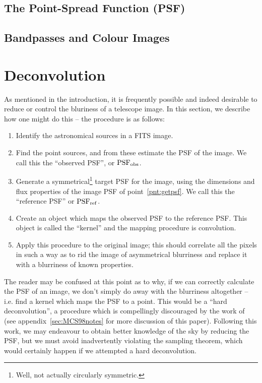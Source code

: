 \documentclass[letterpaper, 11pt]{article}
\def\psfobs{\ensuremath{\rm PSF_{obs}}\xspace}
\def\psfref{\ensuremath{\rm PSF_{ref}}\xspace}
\begin{document}
\subsection{The Point-Spread Function (PSF)}

\subsection{Bandpasses and Colour Images}

\newpage
\section{Deconvolution}
\label{sec:deconvolution}

As mentioned in the introduction, it is frequently possible and indeed desirable to reduce or control the bluriness of a telescope image. In this section, we describe how one might do this -- the procedure is as follows:

\begin{enumerate}
	\item Identify the astronomical sources in a FITS image.
	\item Find the point sources, and from these estimate the PSF of the image. We call this the ``observed PSF'', or \psfobs.\label{pnt:getpsf}
	\item Generate a symmetrical\footnote{Well, not actually circularly symmetric.} target PSF for the image, using the dimensions and flux properties of the image PSF of point~\ref{pnt:getpsf}. We call this the ``reference PSF'' or \psfref.\label{pnt:PSF0}
	\item Create an object which maps the observed PSF to the reference PSF. This object is called the ``kernel'' and the mapping procedure is convolution.
	\item Apply this procedure to the original image; this should correlate all the pixels in such a way as to rid the image of asymmetrical blurriness and replace it with a blurriness of known properties.
\end{enumerate}

The reader may be confused at this point as to why, if we can correctly calculate the PSF of an image, we don't simply do away with the blurriness altogether -- i.e. find a kernel which maps the PSF to a point. This would be a ``hard deconvolution'', a procedure which is compellingly discouraged by the work of \cite{MCS98} (see appendix~\ref{sec:MCS98notes} for more discussion of this paper). Following this work, we may endeavour to obtain better knowledge of the sky by reducing the PSF, but we must avoid inadvertently violating the sampling theorem, which would certainly happen if we attempted a hard deconvolution.
\end{document}
